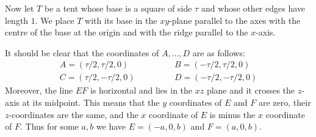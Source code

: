 \documentclass{amsart}
\renewcommand{\:}{\colon}
\theoremstyle{definition}
\begin{document}
Now let $T$ be a tent whose base is a square of side $\tau$ and whose
other edges have length $1$.  We place $T$ with its base in the
$xy$-plane parallel to the axes with the centre of the base at the
origin and with the ridge parallel to the $x$-axis.
\begin{center}
\end{center}
It should be clear that the coordinates of $A,\ldots,D$ are as
follows:
\[ \begin{array}{lll}
    A = ( \tau/2, \tau/2,0) &\hspace{3em}& B = (-\tau/2, \tau/2,0) \\
    C = ( \tau/2,-\tau/2,0) &\hspace{3em}& D = (-\tau/2,-\tau/2,0)
\end{array} \]
Moreover, the line $EF$ is horizontal and lies in the $xz$ plane and
it crosses the $z$-axis at its midpoint.  This means that the $y$
coordinates of $E$ and $F$ are zero, their $z$-coordinates are the
same, and the $x$ coordinate of $E$ is minus the $x$ coordinate of
$F$.  Thus for some $a,b$ we have $E=(-a,0,b)$ and $F=(a,0,b)$.
\end{document}
